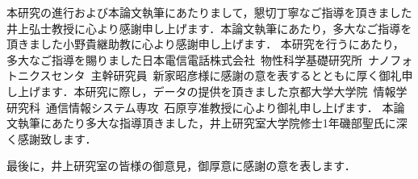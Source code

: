 \acknowledgment
本研究の進行および本論文執筆にあたりまして，懇切丁寧なご指導を頂きました井上弘士教授に心より感謝申し上げます．本論文執筆にあたり，多大なご指導を頂きました小野貴継助教に心より感謝申し上げます．
本研究を行うにあたり，多大なご指導を賜りました日本電信電話株式会社\ 物性科学基礎研究所\ ナノフォトニクスセンタ\ 主幹研究員\ 新家昭彦様に感謝の意を表するとともに厚く御礼申し上げます．本研究に際し，データの提供を頂きました京都大学大学院\ 情報学研究科\ 通信情報システム専攻\ 石原亨准教授に心より御礼申し上げます．  
本論文執筆にあたり多大な指導頂きました，井上研究室大学院修士1年磯部聖氏に深く感謝致します．

最後に，井上研究室の皆様の御意見，御厚意に感謝の意を表します．
